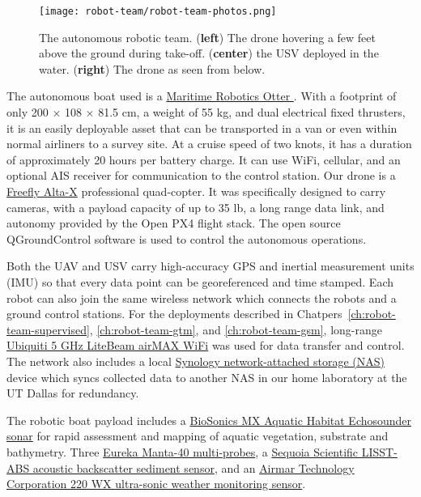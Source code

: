 \begin{figure}[!hbt]
  \centering
  \texttt{[image: robot-team/robot-team-photos.png]}
  \caption{The autonomous robotic team. (\textbf{left}) The drone hovering a few
  feet above the ground during take-off. (\textbf{center}) the USV deployed in
  the water. (\textbf{right}) The drone as seen from below.}
  \label{fig:drone-team}
\end{figure}

The autonomous boat used is a
\href{https://www.maritimerobotics.com/otter}{Maritime Robotics Otter }. With a
footprint of only 200 × 108 × 81.5 cm, a weight of 55 kg, and dual electrical
fixed thrusters, it is an easily deployable asset that can be transported in a
van or even within normal airliners to a survey site. At a cruise speed of two
knots, it has a duration of approximately 20 hours per battery charge. It can use
WiFi, cellular, and an optional AIS receiver for communication to the control
station. Our drone is a \href{https://freeflysystems.com/alta-x}{Freefly Alta-X}
professional quad-copter. It was specifically designed to carry cameras, with a
payload capacity of up to 35 lb, a long range data link, and autonomy provided
by the Open PX4 flight stack. The open source QGroundControl software is used to
control the autonomous operations.

Both the UAV and USV carry high-accuracy GPS and inertial
measurement units (IMU) so that every data point can be georeferenced and time
stamped. Each robot can also join the same wireless network which connects the
robots and a ground control stations. For the deployments described in
Chatpers~\ref{ch:robot-team-supervised}, \ref{ch:robot-team-gtm}, and
\ref{ch:robot-team-gsm}, long-range
\href{https://www.ui.com}{Ubiquiti 5 GHz LiteBeam airMAX WiFi} was used for
data transfer and control. The network
also includes a local \href{https://www.synology.com}{Synology network-attached
  storage (NAS)} device which syncs collected data to another NAS in our home laboratory at the
UT Dallas for redundancy.

The robotic boat payload includes a
\href{https://www.biosonicsinc.com/products/mx-aquatic-habitat-echosounder/}{BioSonics
  MX Aquatic Habitat Echosounder sonar} for rapid assessment and mapping of
aquatic vegetation, substrate and bathymetry. Three
\href{https://www.waterprobes.com/multiprobes-and-sondes-for-monitori}{Eureka
  Manta-40 multi-probes}, a
\href{https://www.sequoiasci.com/product/lisst-abs/}{Sequoia Scientific
  LISST-ABS acoustic backscatter sediment sensor}, and an
\href{https://www.airmar.com/weather-description.html?id=153}{Airmar Technology
  Corporation 220 WX ultra-sonic weather monitoring sensor}.

